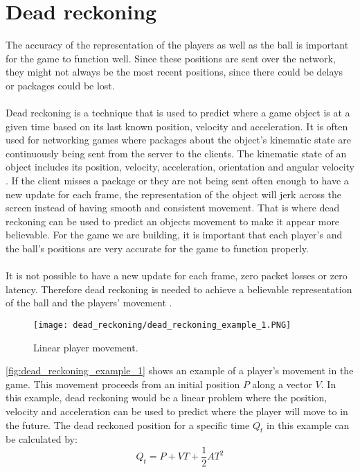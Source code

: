 \section{Dead reckoning}
The accuracy of the representation of the players as well as the ball is important for the game to function well.
Since these positions are sent over the network, they might not always be the most recent positions, since there could be delays or packages could be lost.
\\\\
Dead reckoning is a technique that is used to predict where a game object is at a given time based on its last known position, velocity and acceleration.
It is often used for networking games where packages about the object's kinematic state are continuously being sent from the server to the clients.
The kinematic state of an object includes its position, velocity, acceleration, orientation and angular velocity \autocite{DeadReckoning}.
If the client misses a package or they are not being sent often enough to have a new update for each frame, the representation of the object will jerk across the screen instead of having smooth and consistent movement.
That is where dead reckoning can be used to predict an objects movement to make it appear more believable.
For the game we are building, it is important that each player's and the ball's positions are very accurate for the game to function properly.
\\\\
It is not possible to have a new update for each frame, zero packet losses or zero latency. 
Therefore dead reckoning is needed to achieve a believable representation of the ball and the players' movement \autocite{DeadReckoning}.
\begin{figure}[H]
    \centering
    \texttt{[image: dead\_reckoning/dead\_reckoning\_example\_1.PNG]}
    \caption{Linear player movement.}
    \label{fig:dead_reckoning_example_1}
\end{figure}
\noindent
\autoref{fig:dead_reckoning_example_1} shows an example of a player's movement in the game.
This movement proceeds from an initial position $P$ along a vector $V$.
In this example, dead reckoning would be a linear problem where the position, velocity and acceleration can be used to predict where the player will move to in the future. 
The dead reckoned position for a specific time $Q_t$ in this example can be calculated by:
\begin{displaymath}
    Q_t = P + VT + \frac{1}{2}AT^2
\end{displaymath}
